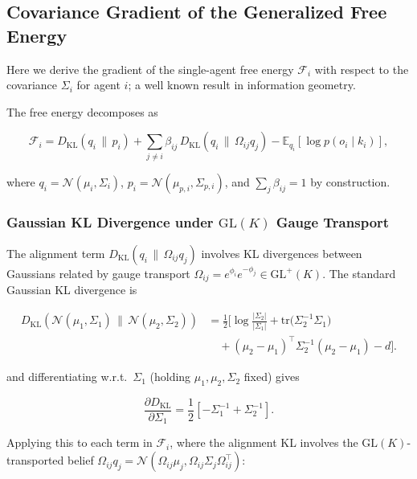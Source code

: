 \documentclass[twoside,11pt]{article}
\begin{document}
\subsection{Covariance Gradient of the Generalized Free Energy}

Here we derive the gradient of the single-agent free energy $\mathcal{F}_i$ with respect to the covariance $\Sigma_i$ for agent $i$; a well known result in information geometry.

The free energy decomposes as

\begin{equation}
\mathcal{F}_i
=D_{\mathrm{KL}}(q_i \,\|\, p_i)
+ \sum_{j \neq i} \beta_{ij}\,
D_{\mathrm{KL}}(q_i \,\|\, \Omega_{ij} q_j)
- \mathbb{E}_{q_i}[\log p(o_i \mid k_i)],
\end{equation}

where $q_i = \mathcal{N}(\mu_i, \Sigma_i)$, $p_i = \mathcal{N}(\mu_{p,i}, \Sigma_{p,i})$, and $\sum_j \beta_{ij} = 1$ by construction.

\subsubsection{Gaussian KL Divergence under $\mathrm{GL}(K)$ Gauge Transport}

The alignment term $D_{\mathrm{KL}}(q_i \,\|\, \Omega_{ij} q_j)$ involves KL divergences between Gaussians related by gauge transport $\Omega_{ij} = e^{\phi_i}e^{-\phi_j} \in \mathrm{GL}^+(K)$. The standard Gaussian KL divergence is

\begin{align}
D_{\mathrm{KL}}\!\left(
\mathcal{N}(\mu_1, \Sigma_1)
\,\|\,
\mathcal{N}(\mu_2, \Sigma_2)
\right)
&=
\frac{1}{2}
\Big[
\log \frac{|\Sigma_2|}{|\Sigma_1|}
+ \mathrm{tr}\!\big(\Sigma_2^{-1}\Sigma_1\big)
\\ &\quad
+ (\mu_2 - \mu_1)^\top
  \Sigma_2^{-1}
  (\mu_2 - \mu_1)
- d
\Big].
\label{eq:gaussian_KL}
\end{align}


and differentiating w.r.t.\ $\Sigma_1$ (holding $\mu_1,\mu_2,\Sigma_2$ fixed) gives

\begin{equation}
\frac{\partial D_{\mathrm{KL}}}{\partial \Sigma_1}
=\frac{1}{2}\left[
-\Sigma_1^{-1}
+ \Sigma_2^{-1}
\right].
\end{equation}

Applying this to each term in $\mathcal{F}_i$, where the alignment KL involves the $\mathrm{GL}(K)$-transported belief $\Omega_{ij} q_j = \mathcal{N}(\Omega_{ij}\mu_j, \Omega_{ij}\Sigma_j\Omega_{ij}^\top)$:
\end{document}
